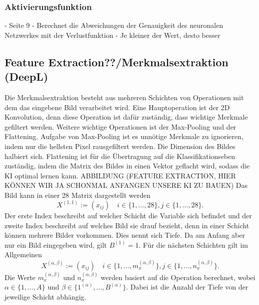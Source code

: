 \documentclass[11pt]{article}
\begin{document}
\subsubsection{Aktivierungsfunktion}
- Seite 9
- Berechnet die Abweichungen der Genauigkeit des neuronalen Netzwerkes mit der Verlustfunktion
- Je kleiner der Wert, desto besser

\subsection{Feature Extraction??/Merkmalsextraktion (DeepL)}
Die Merkmalsextraktion besteht aus mehreren Schichten von Operationen mit dem das eingebene Bild verarbeitet wird.
Eine Hauptoperation ist der 2D Konvolution, denn diese Operation ist dafür zuständig, dass wichtige Merkmale gefiltert werden.
Weitere wichtige Operationen ist der Max-Pooling und der Flattening. Aufgabe von Max-Pooling ist es unnötige Merkmale
zu ignorieren, indem nur die hellsten Pixel rausgefiltert werden. Die Dimension des Bildes halbiert sich. Flattening ist für die Übertragung auf die Klassifikationseben zuständig,
indem die Matrix des Bildes in einen Vektor geflacht wird, sodass die KI optimal lernen kann.
ABBILDUNG (FEATURE EXTRACTION, HIER KÖNNEN WIR JA SCHONMAL ANFANGEN UNSERE KI ZU BAUEN)
Das Bild kann in einer 28 Matrix dargestellt werden
\begin{equation}
    X^{(1,1)} := (x_{ij}) \quad i \in \{1,\ldots,28\}, j \in \{1,\ldots,28\}.
\end{equation}
Der erste Index beschreibt auf welcher Schicht die Variable sich befindet und der zweite Index beschreibt auf welches
Bild sie drauf bezieht, denn in einer Schicht können mehrere Bilder vorkommen. Dies nennt sich Tiefe. Da am Anfang aber nur ein Bild eingegeben wird, gilt
$B^{(1)} = 1$. Für die nächsten Schichten gilt im Allgemeinen
\begin{equation}
    X^{(\alpha,\beta)} := (x_{ij}) \quad i \in \{1,\ldots,m_{x}^{(\alpha,\beta)}\}, j \in \{1,\ldots,n_{x}^{(\alpha,\beta)}\}.
\end{equation}
Die Werte $m_{x}^{(\alpha,\beta)}$ und $n_{x}^{(\alpha,\beta)}$ werden basiert auf die Operation berechnet, wobei
$\alpha \in \{1,\ldots,A\}$ und $\beta \in \{1^{(\alpha)},\ldots,B^{(\alpha)}\}$. Dabei ist die Anzahl der Tiefe von der jeweilige Schicht abhängig.
\end{document}
